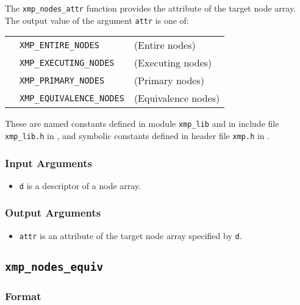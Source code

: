 The {\tt xmp\_nodes\_attr} function provides the attribute of the target
node array. The output value of the argument {\tt attr} is one of:

\begin{tabular}{lll}
  \hspace{2.5cm} & {\tt XMP\_ENTIRE\_NODES} & (Entire nodes)\\
                 & {\tt XMP\_EXECUTING\_NODES}  & (Executing nodes) \\
                 & {\tt XMP\_PRIMARY\_NODES} & (Primary nodes) \\
                 & {\tt XMP\_EQUIVALENCE\_NODES} & (Equivalence nodes) \\
\end{tabular}

These are named constants defined in module {\tt xmp\_lib} 
and in include file {\tt xmp\_lib.h} in {\XMPF}, and symbolic constants
defined in header file {\tt xmp.h} in {\XMPC}.

\subsubsection*{Input Arguments}
\begin{itemize}
 \item {\tt d} is a descriptor of a node array.
\end{itemize}

\subsubsection*{Output Arguments}
\begin{itemize}
 \item {\tt attr} is an attribute of the target node array specified by
       {\tt d}.
\end{itemize}


\subsection{\tt xmp\_nodes\_equiv}

\subsubsection*{Format}

